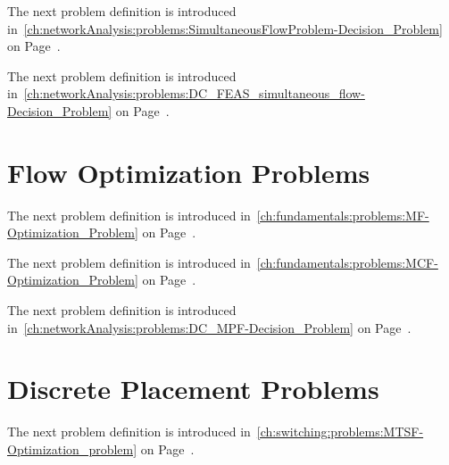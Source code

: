 \gapsizeProblems
The next problem definition is introduced 
in~\cref{ch:networkAnalysis:problems:SimultaneousFlowProblem-Decision_Problem}
on
Page~\pageref{ch:networkAnalysis:problems:SimultaneousFlowProblem-Decision_Problem}.
% 


\gapsizeProblems
The next problem definition is introduced 
in~\cref{ch:networkAnalysis:problems:DC_FEAS_simultaneous_flow-Decision_Problem}
on
Page~\pageref{ch:networkAnalysis:problems:DC_FEAS_simultaneous_flow-Decision_Problem}.
% 

% 
% 
% 
\section{Flow Optimization Problems}
\label{app:problems:flow-optimization-problems}
% 
The next problem definition is introduced 
in~\cref{ch:fundamentals:problems:MF-Optimization_Problem} on
Page~\pageref{ch:fundamentals:problems:MF-Optimization_Problem}.
% 


\gapsizeProblems
The next problem definition is introduced 
in~\cref{ch:fundamentals:problems:MCF-Optimization_Problem} on
Page~\pageref{ch:fundamentals:problems:MCF-Optimization_Problem}.
% 


\gapsizeProblems
The next problem definition is introduced 
in~\cref{ch:networkAnalysis:problems:DC_MPF-Decision_Problem} on
Page~\pageref{ch:networkAnalysis:problems:DC_MPF-Decision_Problem}.
% 

% 
\section{Discrete Placement Problems}
\label{app:problems:discrete-placement-problems}
% 
The next problem definition is introduced 
in~\cref{ch:switching:problems:MTSF-Optimization_problem} on
Page~\pageref{ch:switching:problems:MTSF-Optimization_problem}.
% 


